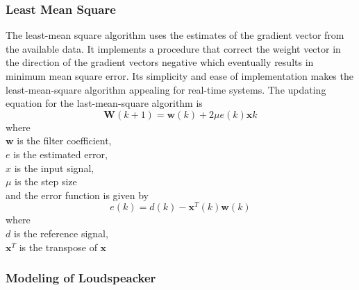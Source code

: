 \subsubsection{Least Mean Square}
The least-mean square algorithm uses the estimates of the gradient vector from the available data. It implements a procedure that correct the weight vector in the direction of the gradient vectors negative which eventually results in minimum mean square error. Its simplicity and ease of implementation makes the least-mean-square algorithm appealing for real-time systems.\cite{Thakkar2017}
The updating equation for the last-mean-square algorithm is
\begin{equation}
    \mathbf{W}(k+1) = \mathbf{w}(k) + 2\mu e(k)\mathbf{x}k
\end{equation}
where\\
$\mathbf{w}$ is the filter coefficient,\\
$e$ is the estimated error,\\
$x$ is the input signal,\\
$\mu$ is the step size\\
and the error function is given by
\begin{equation}
    e(k) = d(k) - \mathbf{x}^T(k)\mathbf{w}(k)
\end{equation}
where\\
$d$ is the reference signal,\\
$\mathbf{x}^T$ is the transpose of $\mathbf{x}$


\subsubsection{Modeling of Loudspeacker}


